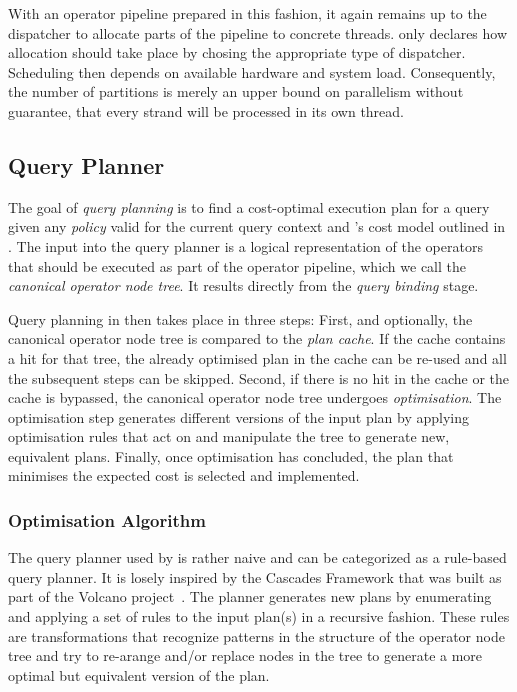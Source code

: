 With an operator pipeline prepared in this fashion, it again remains up to the dispatcher to allocate parts of the pipeline to concrete threads. \cottontail{} only declares how allocation should take place by chosing the appropriate type of dispatcher. Scheduling then depends on available hardware and system load. Consequently, the number of partitions is merely an upper bound on parallelism without guarantee, that every strand will be processed in its own thread. 

\subsection{Query Planner}

The goal of \emph{query planning} is to find a cost-optimal execution plan for a query given any \emph{policy} valid for the current query context and \cottontail{}'s cost model outlined in . The input into the query planner is a logical representation of the operators that should be executed as part of the operator pipeline, which we call the \emph{canonical operator node tree}. It results directly from the \emph{query binding} stage.

Query planning in \cottontail{} then takes place in three steps: First, and optionally, the canonical operator node tree is compared to the \emph{plan cache}. If the cache contains a hit for that tree, the already optimised plan in the cache can be re-used and all the subsequent steps can be skipped. Second, if there is no hit in the cache or the cache is bypassed, the canonical operator node tree undergoes \emph{optimisation}. The optimisation step generates different versions of the input plan by applying optimisation rules that act on and manipulate the tree to generate new, equivalent plans. Finally, once optimisation has concluded, the plan that minimises the expected cost is selected and implemented.

\subsubsection{Optimisation Algorithm}

The query planner used by \cottontail{} is rather naive and can be categorized as a rule-based query planner. It is losely inspired by the Cascades Framework that was built as part of the Volcano project~\cite{Graefe:1993Volcano}. The planner generates new plans by enumerating and applying a set of rules to the input plan(s) in a recursive fashion. These rules are transformations that recognize patterns in the structure of the operator node tree and try to re-arange and/or replace nodes in the tree to generate a more optimal but equivalent version of the plan.

